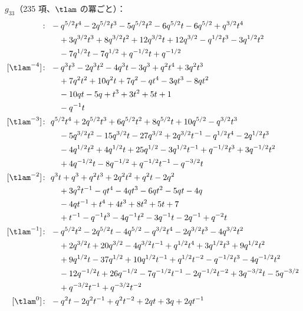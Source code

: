 $g_{33}$（235 項、$\tlam$ の冪ごと）：
\begin{align*}
[\tlam^{-5}]\colon\ & -q^{5/2} t^{4} -2 q^{5/2} t^{3} -5 q^{5/2} t^{2} -6 q^{5/2} t -6 q^{5/2} +q^{3/2} t^{4} \\
& \quad +3 q^{3/2} t^{3} +8 q^{3/2} t^{2} +12 q^{3/2} t +12 q^{3/2} -q^{1/2} t^{3} -3 q^{1/2} t^{2} \\
& \quad -7 q^{1/2} t -7 q^{1/2} +q^{-1/2} t +q^{-1/2} \\
[\tlam^{-4}]\colon\ & -q^{3} t^{3} -2 q^{3} t^{2} -4 q^{3} t -3 q^{3} +q^{2} t^{4} +3 q^{2} t^{3} \\
& \quad +7 q^{2} t^{2} +10 q^{2} t +7 q^{2} -q t^{4} -3 q t^{3} -8 q t^{2} \\
& \quad -10 q t -5 q +t^{3} +3 t^{2} +5 t +1 \\
& \quad -q^{-1} t \\
[\tlam^{-3}]\colon\ & q^{5/2} t^{4} +2 q^{5/2} t^{3} +6 q^{5/2} t^{2} +8 q^{5/2} t +10 q^{5/2} -q^{3/2} t^{3} \\
& \quad -5 q^{3/2} t^{2} -15 q^{3/2} t -27 q^{3/2} +2 q^{3/2} t^{-1} -q^{1/2} t^{4} -2 q^{1/2} t^{3} \\
& \quad -4 q^{1/2} t^{2} +4 q^{1/2} t +25 q^{1/2} -3 q^{1/2} t^{-1} +q^{-1/2} t^{3} +3 q^{-1/2} t^{2} \\
& \quad +4 q^{-1/2} t -8 q^{-1/2} +q^{-1/2} t^{-1} -q^{-3/2} t \\
[\tlam^{-2}]\colon\ & q^{3} t +q^{3} +q^{2} t^{3} +2 q^{2} t^{2} +q^{2} t -2 q^{2} \\
& \quad +3 q^{2} t^{-1} -q t^{4} -4 q t^{3} -6 q t^{2} -5 q t -4 q \\
& \quad -4 q t^{-1} +t^{4} +4 t^{3} +8 t^{2} +5 t +7 \\
& \quad +t^{-1} -q^{-1} t^{3} -4 q^{-1} t^{2} -3 q^{-1} t -2 q^{-1} +q^{-2} t \\
[\tlam^{-1}]\colon\ & -q^{5/2} t^{2} -2 q^{5/2} t -4 q^{5/2} -q^{3/2} t^{4} -2 q^{3/2} t^{3} -4 q^{3/2} t^{2} \\
& \quad +2 q^{3/2} t +20 q^{3/2} -4 q^{3/2} t^{-1} +q^{1/2} t^{4} +3 q^{1/2} t^{3} +9 q^{1/2} t^{2} \\
& \quad +9 q^{1/2} t -37 q^{1/2} +10 q^{1/2} t^{-1} +q^{1/2} t^{-2} -q^{-1/2} t^{3} -4 q^{-1/2} t^{2} \\
& \quad -12 q^{-1/2} t +26 q^{-1/2} -7 q^{-1/2} t^{-1} -2 q^{-1/2} t^{-2} +3 q^{-3/2} t -5 q^{-3/2} \\
& \quad +q^{-3/2} t^{-1} +q^{-3/2} t^{-2} \\
[\tlam^{0}]\colon\ & -q^{2} t -2 q^{2} t^{-1} +q^{2} t^{-2} +2 q t +3 q +2 q t^{-1} \\

\end{align*}
